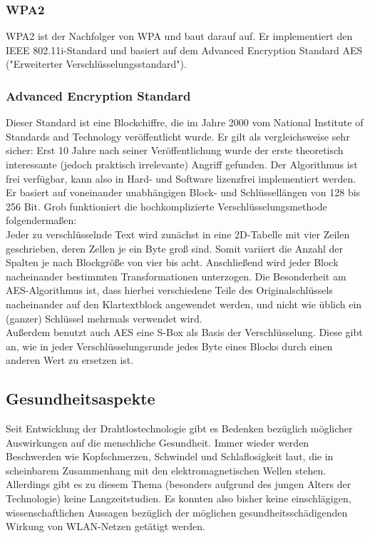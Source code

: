 \documentclass[a4paper,13pt]{scrartcl}
\begin{document}
\subsubsection{WPA2}
WPA2 ist der Nachfolger von WPA und baut darauf auf. Er implementiert den IEEE 802.11i-Standard und basiert auf dem Advanced Encryption Standard AES ("Erweiterter Verschlüsselungsstandard").
\subsubsection{Advanced Encryption Standard}
Dieser Standard ist eine Blockchiffre, die im Jahre 2000 vom National Institute of Standards and Technology veröffentlicht wurde. Er gilt als vergleichsweise sehr sicher: Erst 10 Jahre nach seiner Veröffentlichung wurde der erste theoretisch interessante (jedoch praktisch irrelevante) Angriff gefunden. Der Algorithmus ist frei verfügbar, kann also in Hard- und Software lizenzfrei implementiert werden.\\
Er basiert auf voneinander unabhängigen Block- und Schlüssellängen von 128 bis 256 Bit. Grob funktioniert die hochkomplizierte Verschlüsselungsmethode folgendermaßen:\\
Jeder zu verschlüsselnde Text wird zunächst in eine 2D-Tabelle mit vier Zeilen geschrieben, deren Zellen je ein Byte groß sind. Somit variiert die Anzahl der Spalten je nach Blockgröße von vier bis acht. Anschließend wird jeder Block nacheinander bestimmten Transformationen unterzogen. Die Besonderheit am AES-Algorithmus ist, dass hierbei verschiedene Teile des Originalschlüssels nacheinander auf den Klartextblock angewendet werden, und nicht wie üblich ein (ganzer) Schlüssel mehrmals verwendet wird.\\
Außerdem benutzt auch AES eine S-Box als Basis der Verschlüsselung. Diese gibt an, wie in jeder Verschlüsselungsrunde jedes Byte eines Blocks durch einen anderen Wert zu ersetzen ist.

\subsection{Gesundheitsaspekte}
Seit Entwicklung der Drahtlostechnologie gibt es Bedenken bezüglich möglicher Auswirkungen auf die menschliche Gesundheit. Immer wieder werden Beschwerden wie Kopfschmerzen, Schwindel und Schlaflosigkeit laut, die in scheinbarem Zusammenhang mit den elektromagnetischen Wellen stehen. Allerdings gibt es zu diesem Thema (besonders aufgrund des jungen Alters der Technologie) keine Langzeitstudien. Es konnten also bisher keine einschlägigen, wissenschaftlichen Aussagen bezüglich der möglichen gesundheitsschädigenden Wirkung von WLAN-Netzen getätigt werden.
\end{document}
